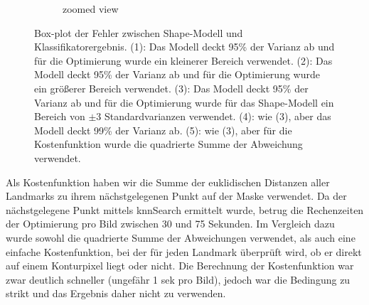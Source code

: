 \documentclass[]{report}
\begin{document}
\begin{enumerate}
\begin{enumerate}
\begin{figure}
\begin{subfigure}[t]{0.48\textwidth}
						\caption{zoomed view}
					\end{subfigure}
					\caption{Box-plot der Fehler zwischen Shape-Modell und Klassifikatorergebnis. (1): Das Modell deckt 95\% der Varianz ab und für die Optimierung wurde ein kleinerer Bereich verwendet. (2): Das Modell deckt 95\% der Varianz ab und für die Optimierung wurde ein größerer Bereich verwendet. (3): Das Modell deckt 95\% der Varianz ab und für die Optimierung wurde für das Shape-Modell ein Bereich von $\pm3$ Standardvarianzen verwendet. (4): wie (3), aber das Modell deckt 99\% der Varianz ab. (5): wie (3), aber für die Kostenfunktion wurde die quadrierte Summe der Abweichung verwendet.}
					\label{fig:box4S4L9L}
				\end{figure}
				Als Kostenfunktion haben wir die Summe der euklidischen Distanzen aller Landmarks zu ihrem nächstgelegenen Punkt auf der Maske verwendet. Da der nächstgelegene Punkt mittels knnSearch ermittelt wurde, betrug die Rechenzeiten der Optimierung pro Bild zwischen 30 und 75 Sekunden. Im Vergleich dazu wurde sowohl die quadrierte Summe der Abweichungen verwendet, als auch eine einfache Kostenfunktion, bei der für jeden Landmark überprüft wird, ob er direkt auf einem Konturpixel liegt oder nicht. Die Berechnung der Kostenfunktion war zwar deutlich schneller (ungefähr 1 sek pro Bild), jedoch war die Bedingung zu strikt und das Ergebnis daher nicht zu verwenden.\\
				

\end{enumerate}
\end{enumerate}
\end{document}
